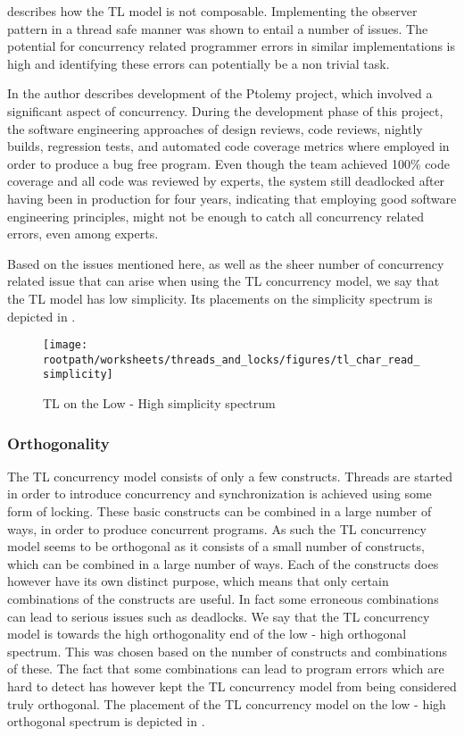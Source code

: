  describes how the \ac{TL} model is not composable. Implementing the observer pattern in a thread safe manner was shown to entail a number of issues. The potential for concurrency related programmer errors in similar implementations is high and identifying these errors can potentially be a non trivial task.

In \cite{lee2006problem} the author describes development of the Ptolemy project\cite{lee1999overview}, which involved a significant aspect of concurrency. During the development phase of this project, the software engineering approaches of design reviews, code reviews, nightly builds, regression tests, and automated code coverage metrics where employed in order to produce a bug free program\cite[p. 8]{lee2006problem}. Even though the team achieved 100\% code coverage and all code was reviewed by experts, the system still deadlocked after having been in production for four years, indicating that employing good software engineering principles, might not be enough to catch all concurrency related errors, even among experts.

Based on the issues mentioned here, as well as the sheer number of concurrency related issue that can arise when using the \ac{TL} concurrency model, we say that the \ac{TL} model has low simplicity. Its placements on the simplicity spectrum is depicted in .

\begin{figure}[htbp]
\centering
 \texttt{[image: \\rootpath/worksheets/threads\_and\_locks/figures/tl\_char\_read\_simplicity]} 
 \caption{\ac{TL} on the Low - High simplicity spectrum}
\label{fig:char_read_simplicity}
\end{figure}

\subsubsection{Orthogonality}\label{sec:tl_orthogonality}
The \ac{TL} concurrency model consists of only a few constructs. Threads are started in order to introduce concurrency and synchronization is achieved using some form of locking. These basic constructs can be combined in a large number of ways, in order to produce concurrent programs. As such the \ac{TL} concurrency model seems to be orthogonal as it consists of a small number of constructs, which can be combined in a large number of ways. Each of the constructs does however have its own distinct purpose, which means that only certain combinations of the constructs are useful. In fact some erroneous combinations can lead to serious issues such as deadlocks. We say that the \ac{TL} concurrency model is towards the high orthogonality end of the low - high orthogonal spectrum. This was chosen based on the number of constructs and combinations of these. The fact that some combinations can lead to program errors which are hard to detect has however kept the \ac{TL} concurrency model from being considered truly orthogonal. The placement of the \ac{TL} concurrency model on the low - high orthogonal spectrum is depicted in .

